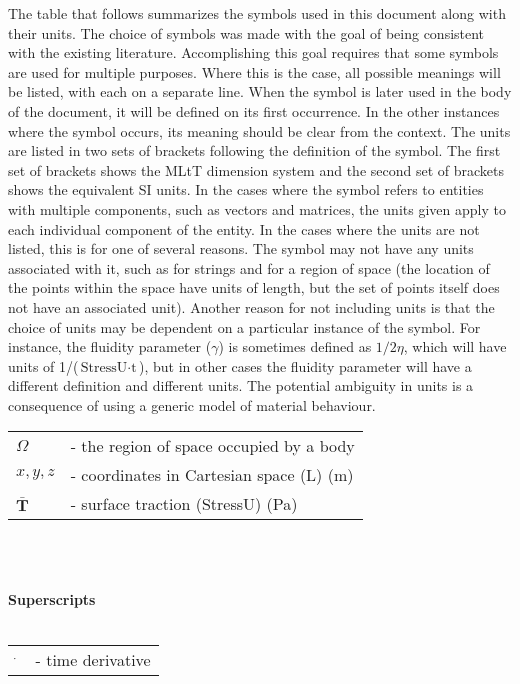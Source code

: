 \documentclass{article}
\newcommand{\blt}{- } %
\begin{document}
The table that follows summarizes the symbols used in this document along with
their units.  The choice of symbols was made with the goal of being consistent
with the existing literature.  Accomplishing this goal requires that some
symbols are used for multiple purposes.  Where this is the case, all possible
meanings will be listed, with each on a separate line.  When the symbol is later
used in the body of the document, it will be defined on its first occurrence.
In the other instances where the symbol occurs, its meaning should be clear from
the context.  The units are listed in two sets of brackets following the
definition of the symbol.  The first set of brackets shows the MLtT dimension
system and the second set of brackets shows the equivalent SI units.  In the
cases where the symbol refers to entities with multiple components, such as
vectors and matrices, the units given apply to each individual component of the
entity.  In the cases where the units are not listed, this is for one of several
reasons.  The symbol may not have any units associated with it, such as for
strings and for a region of space (the location of the points within the space
have units of length, but the set of points itself does not have an associated
unit).  Another reason for not including units is that the choice of units may
be dependent on a particular instance of the symbol.  For instance, the fluidity
parameter ($\gamma$) is sometimes defined as $1/2\eta$, which will have units of
1/($\mbox{StressU} \cdot \mbox{t}$), but in other cases the fluidity parameter
will have a different definition and different units.  The potential ambiguity
in units is a consequence of using a generic model of material behaviour.
~\newline

\begin{supertabular}{l p{10.5cm}}
  $\Omega$ & \blt the region of space occupied by a body\\
  $x, y, z$ & \blt coordinates in Cartesian space (L) (m)\\
  $\bar{\textbf{T}}$ & \blt surface traction (StressU) (Pa)\\
\end{supertabular}\\
~\newline

\noindent \textbf{Superscripts}\\
~\newline

\noindent \begin{tabular}{l l}
  $\dot{~}$ & \blt time derivative\\
\end{tabular}\\
~\newline
\end{document}
